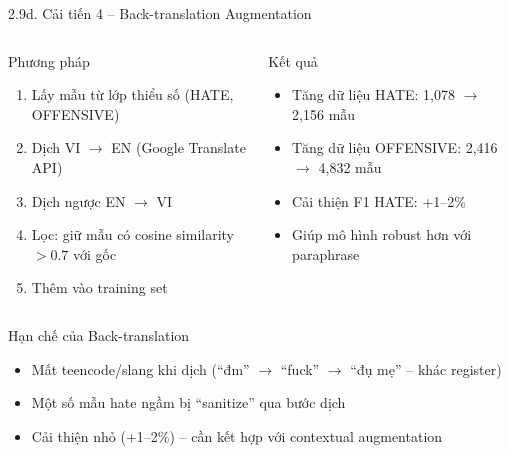 \documentclass[11pt, aspectratio=169]{beamer}
\begin{document}
\begin{frame}[shrink=5]{2.9d. Cải tiến 4 -- Back-translation Augmentation}

\begin{columns}[T]
  \begin{block}{Phương pháp}
    \begin{enumerate}
      \item Lấy mẫu từ lớp thiểu số (HATE, OFFENSIVE)
      \item Dịch VI $\rightarrow$ EN (Google Translate API)
      \item Dịch ngược EN $\rightarrow$ VI
      \item Lọc: giữ mẫu có cosine similarity $> 0.7$ với gốc
      \item Thêm vào training set
    \end{enumerate}
  \end{block}

  \begin{block}{Kết quả}
    \begin{itemize}
      \item Tăng dữ liệu HATE: 1,078 $\rightarrow$ 2,156 mẫu
      \item Tăng dữ liệu OFFENSIVE: 2,416 $\rightarrow$ 4,832 mẫu
      \item Cải thiện F1 HATE: +1--2\%
      \item Giúp mô hình robust hơn với paraphrase
    \end{itemize}
  \end{block}
\end{columns}

\vspace{0.3cm}
\begin{block}{Hạn chế của Back-translation}
  \begin{itemize}
    \item Mất teencode/slang khi dịch (``đm'' $\rightarrow$ ``fuck'' $\rightarrow$ ``đụ mẹ'' -- khác register)
    \item Một số mẫu hate ngầm bị ``sanitize'' qua bước dịch
    \item Cải thiện nhỏ (+1--2\%) -- cần kết hợp với contextual augmentation
  \end{itemize}
\end{block}
\end{frame}
\end{document}
